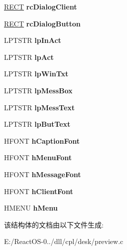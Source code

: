\begin{DoxyCompactItemize}
\mbox{\label{struct___p_r_e_v_i_e_w___d_a_t_a_a22e0a7fce5b9f511170c2ea4ade93be0}} 
\hyperlink{structtag_r_e_c_t}{R\+E\+CT} {\bfseries rc\+Dialog\+Client}
\item 
\mbox{\label{struct___p_r_e_v_i_e_w___d_a_t_a_ab8ee56ab5003243bdad3c8f3da9b6bc3}} 
\hyperlink{structtag_r_e_c_t}{R\+E\+CT} {\bfseries rc\+Dialog\+Button}
\item 
\mbox{\label{struct___p_r_e_v_i_e_w___d_a_t_a_ad7a3ef9defea1f36417d951282bf8fc9}} 
L\+P\+T\+S\+TR {\bfseries lp\+In\+Act}
\item 
\mbox{\label{struct___p_r_e_v_i_e_w___d_a_t_a_a9719291835f49aa6b9917eafeff0374c}} 
L\+P\+T\+S\+TR {\bfseries lp\+Act}
\item 
\mbox{\label{struct___p_r_e_v_i_e_w___d_a_t_a_af43e0fa48e2cb87a3d50190804eb316a}} 
L\+P\+T\+S\+TR {\bfseries lp\+Win\+Txt}
\item 
\mbox{\label{struct___p_r_e_v_i_e_w___d_a_t_a_a3887d5808f804b7c439d2801036b5c9f}} 
L\+P\+T\+S\+TR {\bfseries lp\+Mess\+Box}
\item 
\mbox{\label{struct___p_r_e_v_i_e_w___d_a_t_a_ae476c9499638b7b899388994de4af93a}} 
L\+P\+T\+S\+TR {\bfseries lp\+Mess\+Text}
\item 
\mbox{\label{struct___p_r_e_v_i_e_w___d_a_t_a_a610f0dd43b95b66d409f997a3f98a45b}} 
L\+P\+T\+S\+TR {\bfseries lp\+But\+Text}
\item 
\mbox{\label{struct___p_r_e_v_i_e_w___d_a_t_a_aee0a3e8624bc9fa062f9a1ba4940bf47}} 
H\+F\+O\+NT {\bfseries h\+Caption\+Font}
\item 
\mbox{\label{struct___p_r_e_v_i_e_w___d_a_t_a_a07cc4c945cb5f3f829469b82fcf6b16c}} 
H\+F\+O\+NT {\bfseries h\+Menu\+Font}
\item 
\mbox{\label{struct___p_r_e_v_i_e_w___d_a_t_a_a8672426cc4ae9fea9cbafad345ca8534}} 
H\+F\+O\+NT {\bfseries h\+Message\+Font}
\item 
\mbox{\label{struct___p_r_e_v_i_e_w___d_a_t_a_a7caf2e652539a655902d94c438232105}} 
H\+F\+O\+NT {\bfseries h\+Client\+Font}
\item 
\mbox{\label{struct___p_r_e_v_i_e_w___d_a_t_a_a259eaee217e9b5b541ac2ce8f9340b3d}} 
H\+M\+E\+NU {\bfseries h\+Menu}
\end{DoxyCompactItemize}


该结构体的文档由以下文件生成\+:\begin{DoxyCompactItemize}
\item 
E\+:/\+React\+O\+S-\/0../dll/cpl/desk/preview.\+c\end{DoxyCompactItemize}
